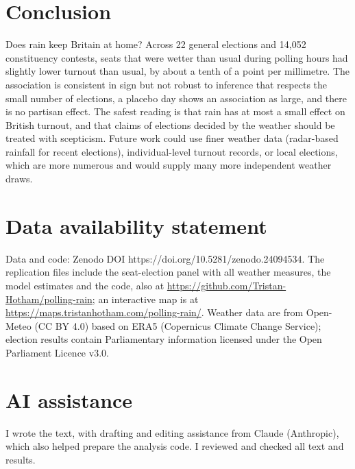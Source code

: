 \documentclass[11pt,a4paper]{article}
\begin{document}
\section{Conclusion}\label{sec:concl}
Does rain keep Britain at home? Across 22 general elections and 14{,}052 constituency contests, seats that were wetter than usual during polling hours had slightly lower turnout than usual, by about a tenth of a point per millimetre. The association is consistent in sign but not robust to inference that respects the small number of elections, a placebo day shows an association as large, and there is no partisan effect. The safest reading is that rain has at most a small effect on British turnout, and that claims of elections decided by the weather should be treated with scepticism. Future work could use finer weather data (radar-based rainfall for recent elections), individual-level turnout records, or local elections, which are more numerous and would supply many more independent weather draws.

\section*{Data availability statement}
Data and code: Zenodo DOI https://doi.org/10.5281/zenodo.24094534. The replication files include the seat-election panel with all weather measures, the model estimates and the code, also at \url{https://github.com/Tristan-Hotham/polling-rain}; an interactive map is at \url{https://maps.tristanhotham.com/polling-rain/}. Weather data are from Open-Meteo (CC BY 4.0) based on ERA5 (Copernicus Climate Change Service); election results contain Parliamentary information licensed under the Open Parliament Licence v3.0.

\section*{AI assistance}
I wrote the text, with drafting and editing assistance from Claude (Anthropic), which also helped prepare the analysis code. I reviewed and checked all text and results.
\end{document}
